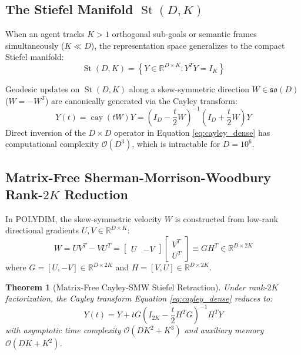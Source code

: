 \documentclass[11pt,twoside,a4paper]{article}
\theoremstyle{plain}
\newtheorem{theorem}{Theorem}[section]
\theoremstyle{definition}
\theoremstyle{remark}
\newcommand{\R}{\mathbb{R}}
\newcommand{\St}{\operatorname{St}}
\begin{document}

\subsection{The Stiefel Manifold $\St(D, K)$}

When an agent tracks $K > 1$ orthogonal sub-goals or semantic frames simultaneously ($K \ll D$), the representation space generalizes to the compact Stiefel manifold:
\begin{equation}
\St(D, K) = \left\{ Y \in \R^{D \times K} : Y^T Y = I_K \right\}
\end{equation}

Geodesic updates on $\St(D, K)$ along a skew-symmetric direction $W \in \mathfrak{so}(D)$ ($W = -W^T$) are canonically generated via the Cayley transform:
\begin{equation}
Y(t) = \operatorname{cay}(t W) Y = \left( I_D - \frac{t}{2} W \right)^{-1} \left( I_D + \frac{t}{2} W \right) Y

\end{equation}
Direct inversion of the $D \times D$ operator in Equation \eqref{eq:cayley_dense} has computational complexity $\mathcal{O}(D^3)$, which is intractable for $D = 10^6$.

\subsection{Matrix-Free Sherman-Morrison-Woodbury Rank-$2K$ Reduction}

In POLYDIM, the skew-symmetric velocity $W$ is constructed from low-rank directional gradients $U, V \in \R^{D \times K}$:
\begin{equation}
W = U V^T - V U^T = \begin{bmatrix} U & -V \end{bmatrix} \begin{bmatrix} V^T \\ U^T \end{bmatrix} \equiv G H^T \in \R^{D \times 2K}
\end{equation}
where $G = [U, -V] \in \R^{D \times 2K}$ and $H = [V, U] \in \R^{D \times 2K}$.

\begin{theorem}[Matrix-Free Cayley-SMW Stiefel Retraction]
Under rank-$2K$ factorization, the Cayley transform Equation \eqref{eq:cayley_dense} reduces to:
\begin{equation}
Y(t) = Y + t G \left( I_{2K} - \frac{t}{2} H^T G \right)^{-1} H^T Y

\end{equation}
with asymptotic time complexity $\mathcal{O}(D K^2 + K^3)$ and auxiliary memory $\mathcal{O}(D K + K^2)$.
\end{theorem}
\end{document}
